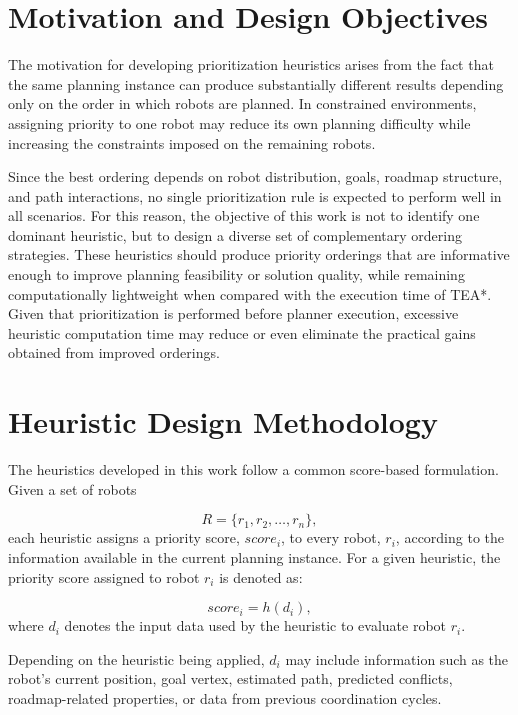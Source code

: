 \section{Motivation and Design Objectives}
\label{sec:heuristics_motivation}
\hspace{\parindent}
The motivation for developing prioritization heuristics arises from the fact that the same planning instance can produce substantially different results depending only on the order in which robots are planned. In constrained environments, assigning priority to one robot may reduce its own planning difficulty while increasing the constraints imposed on the remaining robots.

Since the best ordering depends on robot distribution, goals, roadmap structure, and path interactions, no single prioritization rule is expected to perform well in all scenarios. For this reason, the objective of this work is not to identify one dominant heuristic, but to design a diverse set of complementary ordering strategies. These heuristics should produce priority orderings that are informative enough to improve planning feasibility or solution quality, while remaining computationally lightweight when compared with the execution time of TEA*. Given that prioritization is performed before planner execution, excessive heuristic computation time may reduce or even eliminate the practical gains obtained from improved orderings.
\section{Heuristic Design Methodology}
\label{sec:heuristic_design_methodology}
\hspace{\parindent}
The heuristics developed in this work follow a common score-based formulation. Given a set of robots

\begin{equation}
    R = \{r_1, r_2, \ldots, r_n\},
\end{equation}
each heuristic assigns a priority score, $score_i$, to every robot, $r_i$, according to the information available in the current planning instance. For a given heuristic, the priority score assigned to robot \(r_i\) is denoted as:

\begin{equation}
    score_i = h(d_i),
\end{equation}
where \(d_i\) denotes the input data used by the heuristic to evaluate robot \(r_i\). 

Depending on the heuristic being applied, \(d_i\) may include information such as the robot's current position, goal vertex, estimated path, predicted conflicts, roadmap-related properties, or data from previous coordination cycles.


